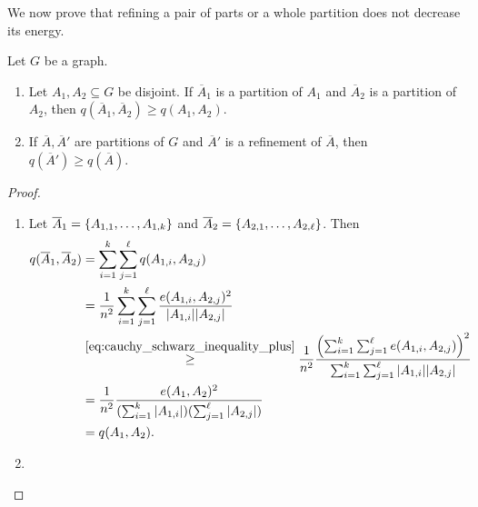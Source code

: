         We now prove that refining a pair of parts or a whole partition does not decrease its energy.
        \begin{lemma} \label{lem:energy_does_not_decrease_when_refining}
            Let $G$ be a graph.
            \begin{enumerate}
                \item Let $A_1, A_2 \subseteq G$ be disjoint.
                    If $\overline{A}_1$ is a partition of $A_1$ and $\overline{A}_2$ is a partition of $A_2$, then
                    $q(\overline{A}_1, \overline{A}_2) \geq q(A_1, A_2)$.
                \item If $\overline{A}, \overline{A}'$ are partitions of $G$ and $\overline{A}'$ is a refinement of
                    $\overline{A}$, then $q(\overline{A}') \geq q(\overline{A})$.
            \end{enumerate}
            \begin{proof}
                \begin{enumerate}
                    \item \label{lem:energy_does_not_decrease_when_refining.1}
                        Let $\overline{A}_1 = \{ A_{1,1}, \dots, A_{1,k} \}$ and
                        $\overline{A}_2 = \{ A_{2,1}, \dots, A_{2,\ell} \}$.
                        Then
                        \begin{align*}
                            q(\overline{A}_1, \overline{A}_2)
                                & = \sum_{i=1}^k \sum_{j=1}^\ell q(A_{1,i}, A_{2,j}) \\
                                & = \frac{1}{n^2} \sum_{i=1}^k \sum_{j=1}^\ell \frac{e(A_{1,i}, A_{2,j})^2}{|A_{1,i}||A_{2,j}|} \\
                                & \stackrel{\eqref{eq:cauchy_schwarz_inequality_plus}}{\geq} \frac{1}{n^2}
                                    \frac{\left( \sum_{i=1}^k \sum_{j=1}^\ell e(A_{1,i}, A_{2,j}) \right)^2}
                                    {\sum_{i=1}^k \sum_{j=1}^\ell |A_{1,i}||A_{2,j}|} \\
                                & = \frac{1}{n^2} \frac{e(A_1, A_2)^2}
                                    {(\sum_{i=1}^k |A_{1,i}|)(\sum_{j=1}^\ell |A_{2,j}|)} \\
                                & = q(A_1, A_2).
                        \end{align*}
                    \item \label{lem:energy_does_not_decrease_when_refining.2}

\end{enumerate}
\end{proof}
\end{lemma}
